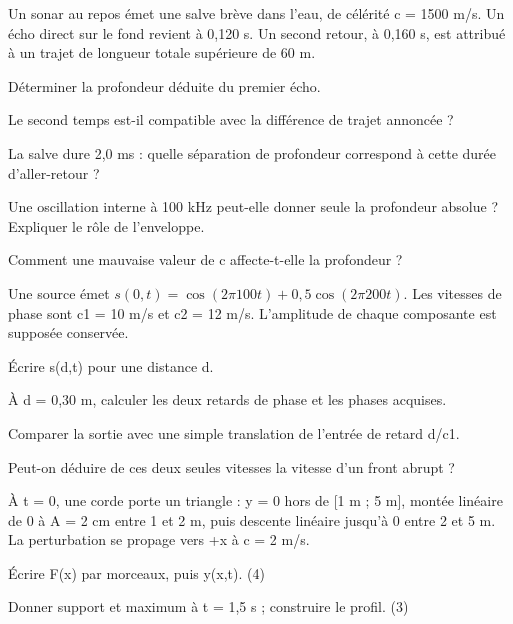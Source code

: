 \label{ch08-ex-D2}
Un sonar au repos émet une salve brève dans l’eau, de célérité c = 1500 m/s. Un écho direct sur le fond revient à 0,120 s. Un second retour, à 0,160 s, est attribué à un trajet de longueur totale supérieure de 60 m.\begin{questions}
\item Déterminer la profondeur déduite du premier écho.
\item Le second temps est-il compatible avec la différence de trajet annoncée ?
\item La salve dure 2,0 ms : quelle séparation de profondeur correspond à cette durée d’aller-retour ?
\item Une oscillation interne à 100 kHz peut-elle donner seule la profondeur absolue ? Expliquer le rôle de l’enveloppe.
\item Comment une mauvaise valeur de c affecte-t-elle la profondeur ?
\end{questions}


\label{ch08-ex-D3}
Une source émet $s(0,t)=\cos(2\pi100t)+0{,}5\cos(2\pi200t)$. Les vitesses de phase sont c1 = 10 m/s et c2 = 12 m/s. L’amplitude de chaque composante est supposée conservée.\begin{questions}
\item Écrire s(d,t) pour une distance d.
\item À d = 0,30 m, calculer les deux retards de phase et les phases acquises.
\item Comparer la sortie avec une simple translation de l’entrée de retard d/c1.
\item Peut-on déduire de ces deux seules vitesses la vitesse d’un front abrupt ?
\end{questions}


À t = 0, une corde porte un triangle : y = 0 hors de [1 m ; 5 m], montée linéaire de 0 à A = 2 cm entre 1 et 2 m, puis descente linéaire jusqu’à 0 entre 2 et 5 m. La perturbation se propage vers +x à c = 2 m/s.
\begin{questions}
\item Écrire F(x) par morceaux, puis y(x,t). (4)
\item Donner support et maximum à t = 1,5 s ; construire le profil. (3)
\end{questions}

